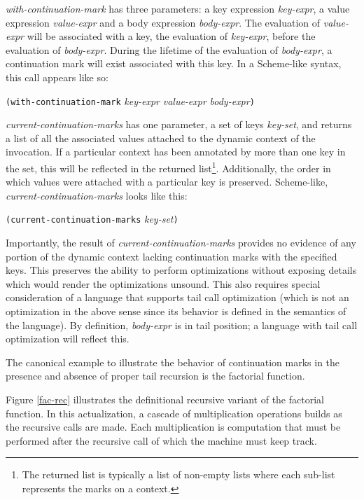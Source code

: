 \documentclass[ms]{byuprop}
\newcounter{definition}
\newcounter{example}
\begin{document}
\emph{with-continuation-mark} has three parameters: a key expression \emph{key-expr}, a 
value expression \emph{value-expr} and a body expression \emph{body-expr}. The evaluation 
of \emph{value-expr} will be associated with a key, the evaluation of \emph{key-expr}, 
before the evaluation of \emph{body-expr}. During the lifetime of the evaluation of 
\emph{body-expr}, a continuation mark will exist associated with this key. In a Scheme-like 
syntax, this call appears like so:

\texttt{(with-continuation-mark} \emph{key-expr} \emph{value-expr} \emph{body-expr}\texttt{)}

\emph{current-continuation-marks} has one parameter, a set of keys \emph{key-set}, and returns a list of
all the associated values attached to the dynamic context of the invocation. If a particular 
context has been annotated by more than one key in the set, this will be reflected in the 
returned list\footnote{The returned list is typically a list of non-empty lists where each 
sub-list represents the marks on a context.}. Additionally, the order in which values were 
attached with a particular key is preserved. Scheme-like, \emph{current-continuation-marks}
looks like this:

\texttt{(current-continuation-marks} \emph{key-set}\texttt{)}

Importantly, the result of \emph{current-continuation-marks} provides no evidence of any portion of the
dynamic context lacking continuation marks with the specified keys. This preserves the
ability to perform optimizations without exposing details which would render the
optimizations unsound. This also requires special consideration of a language that
supports tail call optimization (which is not an optimization in the above sense since its
behavior is defined in the semantics of the language). By definition, \emph{body-expr} is 
in tail position; a language with tail call optimization will reflect this.

The canonical example to illustrate the behavior of continuation marks in the presence and
absence of proper tail recursion is the factorial function.

Figure \ref{fac-rec} illustrates the definitional recursive variant of the factorial
function. In this actualization, a cascade of multiplication operations builds as the
recursive calls are made. Each multiplication is computation that must be performed after
the recursive call of which the machine must keep track.
\end{document}
